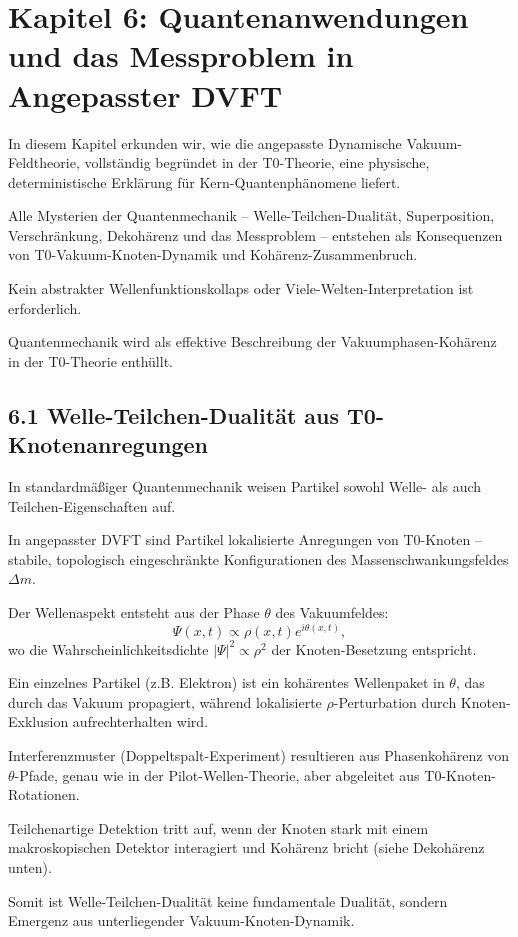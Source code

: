 \documentclass[12pt,a4paper]{article}
\begin{document}
	\section{Kapitel 6: Quantenanwendungen und das Messproblem in Angepasster DVFT}
	
	In diesem Kapitel erkunden wir, wie die angepasste Dynamische Vakuum-Feldtheorie, vollständig begründet in der T0-Theorie, eine physische, deterministische Erklärung für Kern-Quantenphänomene liefert.
	
	Alle Mysterien der Quantenmechanik – Welle-Teilchen-Dualität, Superposition, Verschränkung, Dekohärenz und das Messproblem – entstehen als Konsequenzen von T0-Vakuum-Knoten-Dynamik und Kohärenz-Zusammenbruch.
	
	Kein abstrakter Wellenfunktionskollaps oder Viele-Welten-Interpretation ist erforderlich.
	
	Quantenmechanik wird als effektive Beschreibung der Vakuumphasen-Kohärenz in der T0-Theorie enthüllt.
	
	\subsection{6.1 Welle-Teilchen-Dualität aus T0-Knotenanregungen}
	
	In standardmäßiger Quantenmechanik weisen Partikel sowohl Welle- als auch Teilchen-Eigenschaften auf.
	
	In angepasster DVFT sind Partikel lokalisierte Anregungen von T0-Knoten – stabile, topologisch eingeschränkte Konfigurationen des Massenschwankungsfeldes $\Delta m$.
	
	Der Wellenaspekt entsteht aus der Phase $\theta$ des Vakuumfeldes:
	\[
	\Psi(x,t) \propto \rho(x,t) e^{i\theta(x,t)},
	\]
	wo die Wahrscheinlichkeitsdichte $|\Psi|^2 \propto \rho^2$ der Knoten-Besetzung entspricht.
	
	Ein einzelnes Partikel (z.B. Elektron) ist ein kohärentes Wellenpaket in $\theta$, das durch das Vakuum propagiert, während lokalisierte $\rho$-Perturbation durch Knoten-Exklusion aufrechterhalten wird.
	
	Interferenzmuster (Doppeltspalt-Experiment) resultieren aus Phasenkohärenz von $\theta$-Pfade, genau wie in der Pilot-Wellen-Theorie, aber abgeleitet aus T0-Knoten-Rotationen.
	
	Teilchenartige Detektion tritt auf, wenn der Knoten stark mit einem makroskopischen Detektor interagiert und Kohärenz bricht (siehe Dekohärenz unten).
	
	Somit ist Welle-Teilchen-Dualität keine fundamentale Dualität, sondern Emergenz aus unterliegender Vakuum-Knoten-Dynamik.
	
\end{document}
